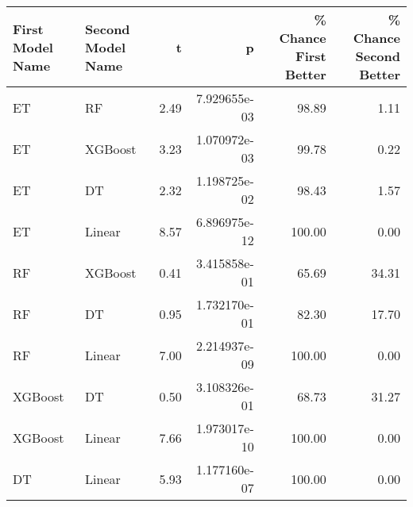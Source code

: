 \begin{tabular}{llrrrr}
\toprule
First Model Name & Second Model Name &    t &            p &  \% Chance First Better &  \% Chance Second Better \\
\midrule
              ET &                RF & 2.49 & 7.929655e-03 &                  98.89 &                    1.11 \\
              ET &           XGBoost & 3.23 & 1.070972e-03 &                  99.78 &                    0.22 \\
              ET &                DT & 2.32 & 1.198725e-02 &                  98.43 &                    1.57 \\
              ET &            Linear & 8.57 & 6.896975e-12 &                 100.00 &                    0.00 \\
              RF &           XGBoost & 0.41 & 3.415858e-01 &                  65.69 &                   34.31 \\
              RF &                DT & 0.95 & 1.732170e-01 &                  82.30 &                   17.70 \\
              RF &            Linear & 7.00 & 2.214937e-09 &                 100.00 &                    0.00 \\
         XGBoost &                DT & 0.50 & 3.108326e-01 &                  68.73 &                   31.27 \\
         XGBoost &            Linear & 7.66 & 1.973017e-10 &                 100.00 &                    0.00 \\
              DT &            Linear & 5.93 & 1.177160e-07 &                 100.00 &                    0.00 \\
\bottomrule
\end{tabular}
